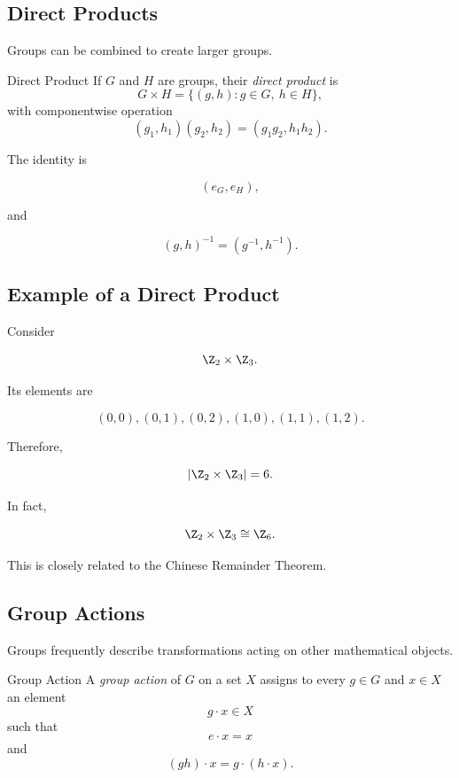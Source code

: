 \subsection{Direct Products}
\label{subsec:direct-products-groups}

Groups can be combined to create larger groups.

\begin{definitionbox}{Direct Product}
If \(G\) and \(H\) are groups, their \emph{direct product} is
\[ G\times H=\{(g,h):g\in G,\ h\in H\}, \]
with componentwise operation
\[ (g_1,h_1)(g_2,h_2)=(g_1g_2,h_1h_2). \]
\end{definitionbox}

The identity is

\[ (e_G,e_H), \]

and

\[ (g,h)^{-1}=(g^{-1},h^{-1}). \]

\subsection{Example of a Direct Product}
\label{subsec:direct-product-example}

Consider

\[ \Z_2\times\Z_3. \]

Its elements are

\[ (0,0),(0,1),(0,2),(1,0),(1,1),(1,2). \]

Therefore,

\[ |\Z_2\times\Z_3|=6. \]

In fact,

\[ \Z_2\times\Z_3\cong\Z_6. \]

This is closely related to the Chinese Remainder Theorem.

\subsection{Group Actions}
\label{subsec:group-actions}

Groups frequently describe transformations acting on other mathematical
objects.

\begin{definitionbox}{Group Action}
A \emph{group action} of \(G\) on a set \(X\) assigns to every \(g\in G\) and
\(x\in X\) an element
\[ g\cdot x\in X \]
such that
\[ e\cdot x=x \]
and
\[ (gh)\cdot x=g\cdot(h\cdot x). \]
\end{definitionbox}

